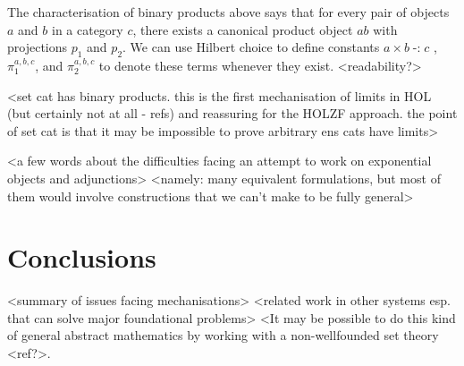 \documentclass[twoside,titlepage,11pt]{article}
\begin{document}
The characterisation of binary products above says that for every pair of objects $a$ and $b$ in a category $c$, there exists a canonical product object $ab$ with projections $p_1$ and $p_2$.
We can use Hilbert choice to define constants $a\times b\operatorname{\mathtt{-:}}c$ , $\pi_1^{a,b,c}$, and $\pi_2^{a,b,c}$ to denote these terms whenever they exist.
<readability?>

<set cat has binary products. this is the first mechanisation of limits in HOL (but certainly not at all - refs) and reassuring for the HOLZF approach. the point of set cat is that it may be impossible to prove arbitrary ens cats have limits>

<a few words about the difficulties facing an attempt to work on exponential objects and adjunctions>
<namely: many equivalent formulations, but most of them would involve constructions that we can't make to be fully general>
\section{Conclusions}%
<summary of issues facing mechanisations>
<related work in other systems esp. that can solve major foundational problems>
<It may be possible to do this kind of general abstract mathematics by working with a non-wellfounded set theory <ref?>.


\end{document}
